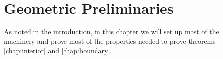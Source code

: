 \chapter{Geometric Preliminaries}\label{chap:preliminaries}
As noted in the introduction, in this chapter we will set up most of the machinery and prove most of the properties needed to prove theorems \ref{chap:interior} and \ref{chap:boundary}.



